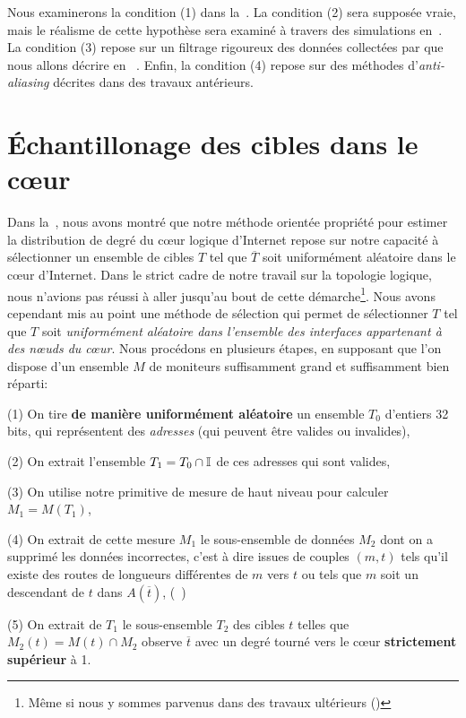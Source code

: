 Nous examinerons la condition (1) dans la~. La
condition (2) sera supposée vraie, mais le réalisme de cette hypothèse sera
examiné à travers des simulations en~. La condition
(3) repose sur un filtrage rigoureux des données collectées par \traceroute
\aposteriori que nous allons décrire en ~. Enfin,
la condition (4) repose sur des méthodes d'{\em anti-aliasing} décrites dans des
travaux antérieurs.

\section{\'Echantillonage des cibles dans le cœur}
\label{sec:traceroute-sampling}

Dans la~, nous avons montré que notre méthode
orientée propriété pour estimer la distribution de degré du cœur logique
d'Internet repose sur notre capacité à sélectionner un ensemble de cibles $T$
tel que $\overline{T}$ soit uniformément aléatoire dans le cœur d'Internet. Dans
le strict cadre de notre travail sur la topologie logique, nous n'avions pas
réussi à aller jusqu'au bout de cette démarche\footnote{Même si nous y sommes
parvenus dans des travaux ultérieurs ()}. Nous avons cependant
mis au point une méthode de sélection qui permet de sélectionner $T$ tel que $T$ soit
{\em uniformément aléatoire dans l'ensemble des interfaces appartenant à des
n\oe{}uds du cœur}. Nous procédons en plusieurs étapes, en supposant que l'on
dispose d'un ensemble $M$ de moniteurs suffisamment grand et suffisamment bien
réparti:
\begin{bulletpoints}
  \item (1) On tire {\bf de manière uniformément aléatoire} un ensemble $T_0$
  d'entiers 32 bits, qui représentent des {\em adresses \ip} (qui peuvent être
  valides ou invalides),
  \item (2) On extrait l'ensemble $T_1 = T_0 \cap \mathbb{I}$ de ces adresses qui
  sont valides,
  \item (3) On utilise notre primitive de mesure de haut niveau pour calculer
  $M_1 = M(T_1)$,
  \item (4) On extrait de cette mesure $M_1$ le sous-ensemble de données $M_2$
  dont on a supprimé les données incorrectes, c'est à dire issues de couples $(m, t)$
  tels qu'il existe des routes de longueurs différentes de $m$ vers $t$ ou tels
  que $m$ soit un descendant de $t$ dans $A(\overline{t})$,
  (\cf~)
  \item (5) On extrait de $T_1$ le sous-ensemble $T_2$ des cibles $t$ telles que
  $M_2(t) = M(t) \cap M_2$ observe $\overline{t}$ avec un degré tourné vers le
  cœur {\bf strictement supérieur} à 1.
\end{bulletpoints}

